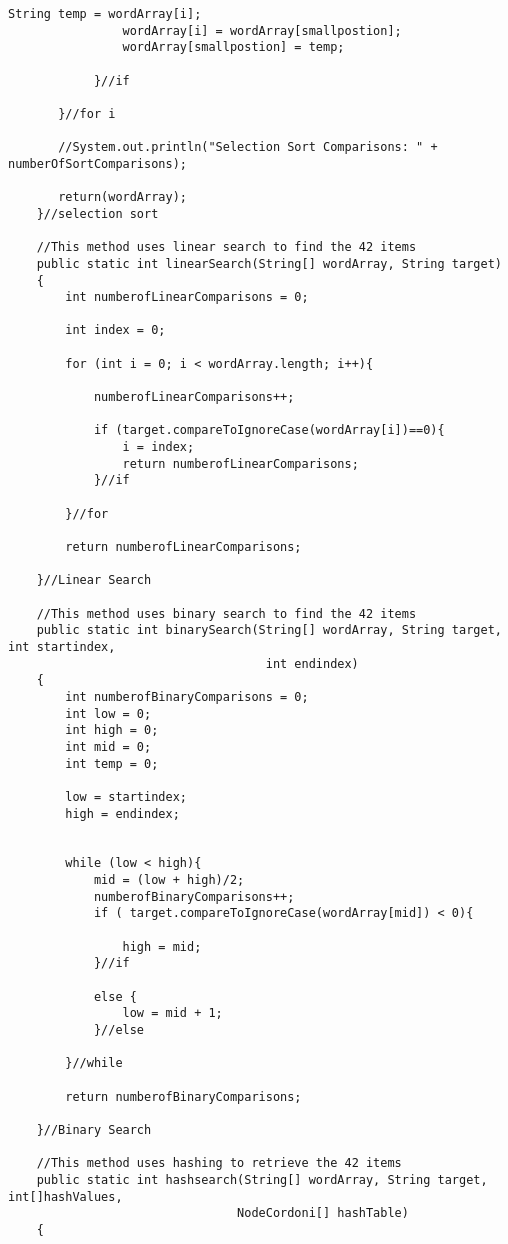 \documentclass[letterpaper, 10pt,DIV=13]{scrartcl}
\numberwithin{equation}{section} %
\numberwithin{figure}{section} %
\numberwithin{table}{section} %
\begin{document}
\begin{lstlisting}[frame=single, ]
                String temp = wordArray[i];
                wordArray[i] = wordArray[smallpostion];
                wordArray[smallpostion] = temp;

            }//if

       }//for i 

       //System.out.println("Selection Sort Comparisons: " + numberOfSortComparisons);

       return(wordArray);
    }//selection sort

    //This method uses linear search to find the 42 items
    public static int linearSearch(String[] wordArray, String target)
    {
        int numberofLinearComparisons = 0;
        
        int index = 0;

        for (int i = 0; i < wordArray.length; i++){

            numberofLinearComparisons++; 

            if (target.compareToIgnoreCase(wordArray[i])==0){
                i = index;
                return numberofLinearComparisons;
            }//if

        }//for
        
        return numberofLinearComparisons;
        
    }//Linear Search

    //This method uses binary search to find the 42 items
    public static int binarySearch(String[] wordArray, String target, int startindex, 
                                    int endindex)
    {
        int numberofBinaryComparisons = 0;
        int low = 0;
        int high = 0;
        int mid = 0;
        int temp = 0;
        
        low = startindex;
        high = endindex;
        

        while (low < high){
            mid = (low + high)/2;
            numberofBinaryComparisons++;
            if ( target.compareToIgnoreCase(wordArray[mid]) < 0){
                
                high = mid;
            }//if

            else {
                low = mid + 1;
            }//else

        }//while
         
        return numberofBinaryComparisons;
         
    }//Binary Search

    //This method uses hashing to retrieve the 42 items
    public static int hashsearch(String[] wordArray, String target, int[]hashValues, 
                                NodeCordoni[] hashTable)
    {


\end{lstlisting}
\end{document}
